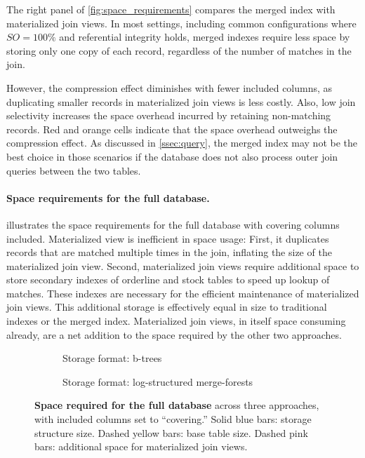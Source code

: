 \documentclass[biblatex, english]{lni}
\begin{document}
The right panel of \cref{fig:space_requirements} compares the merged index with materialized join views.
In most settings, including common configurations where \(SO=100\%\) and referential integrity holds, merged indexes require less space by storing only one copy of each record, regardless of the number of matches in the join.

However, the compression effect diminishes with fewer included columns, as duplicating smaller records in materialized join views is less costly.
Also, low join selectivity increases the space overhead incurred by retaining non-matching records.
Red and orange cells indicate that the space overhead outweighs the compression effect.
As discussed in \cref{ssec:query}, the merged index may not be the best choice in those scenarios if the database does not also process outer join queries between the two tables.

\paragraph{Space requirements for the full database.}

 illustrates the space requirements for the full database with covering columns included.
Materialized view is inefficient in space usage: First, it duplicates records that are matched multiple times in the join, inflating the size of the materialized join view.
Second, materialized join views require additional space to store secondary indexes of orderline and stock tables to speed up lookup of matches.
These indexes are necessary for the efficient maintenance of materialized join views.
This additional storage is effectively equal in size to traditional indexes or the merged index. 
Materialized join views, in itself space consuming already, are a net addition to the space required by the other two approaches.

\begin{figure}[htb]
    \begin{subfigure}{0.48\linewidth}
        \centering
        \caption{Storage format: b-trees}\label{fig:size_b-tree}
    \end{subfigure}\hfill
    \begin{subfigure}{0.48\linewidth}
        \centering
        \caption{Storage format: log-structured merge-forests}\label{fig:size_lsm-forest}
    \end{subfigure}
    \caption{\textbf{Space required for the full database} across three approaches, with included columns set to ``covering.''
    Solid blue bars: storage structure size. Dashed yellow bars: base table size. Dashed pink bars: additional space for materialized join views.}\label{fig:size_overview}
\end{figure}
\end{document}
